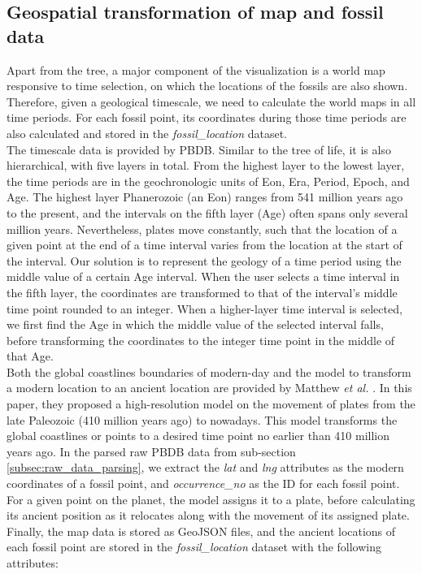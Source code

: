 \documentclass[11pt, a4paper,oneside,chapterprefix=false]{scrbook}
\begin{document}
\subsection{Geospatial transformation of map and fossil data} \label{subsec:geospatial_transformation}
Apart from the tree, a major component of the visualization is a world map responsive to time selection, on which the locations of the fossils are also shown. Therefore, given a geological timescale, we need to calculate the world maps in all time periods. For each fossil point, its coordinates during those time periods are also calculated and stored in the \emph{fossil\_location} dataset. \\

The timescale data is provided by PBDB. Similar to the tree of life, it is also hierarchical, with five layers in total. From the highest layer to the lowest layer, the time periods are in the geochronologic units of Eon, Era, Period, Epoch, and Age. The highest layer Phanerozoic (an Eon) ranges from 541 million years ago to the present, and the intervals on the fifth layer (Age) often spans only several million years. Nevertheless, plates move constantly, such that the location of a given point at the end of a time interval varies from the location at the start of the interval. Our solution is to represent the geology of a time period using the middle value of a certain Age interval. When the user selects a time interval in the fifth layer, the coordinates are transformed to that of the interval's middle time point rounded to an integer. When a higher-layer time interval is selected, we first find the Age in which the middle value of the selected interval falls, before transforming the coordinates to the integer time point in the middle of that Age. \\

Both the global coastlines boundaries of modern-day and the model to transform a modern location to an ancient location are provided by Matthew \emph{et al.} \cite{matthews2016global}. In this paper, they proposed a high-resolution model on the movement of plates from the late Paleozoic (410 million years ago) to nowadays. This model transforms the global coastlines or points to a desired time point no earlier than 410 million years ago. In the parsed raw PBDB data from sub-section \ref{subsec:raw_data_parsing}, we extract the \emph{lat} and \emph{lng} attributes as the modern coordinates of a fossil point, and \emph{occurrence\_no} as the ID for each fossil point. For a given point on the planet, the model assigns it to a plate, before calculating its ancient position as it relocates along with the movement of its assigned plate. Finally, the map data is stored as GeoJSON files, and the ancient locations of each fossil point are stored in the \emph{fossil\_location} dataset with the following attributes: \\
\end{document}
